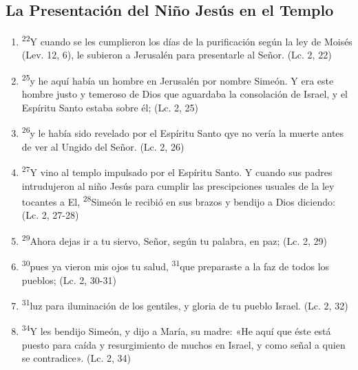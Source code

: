 \documentclass[a4paper,11pt]{article}
\begin{document}
    \subsection*{\hfil La Presentación del Niño Jesús en el Templo \hfil}
      
      \begin{enumerate}
        
        \item \textsuperscript{22}Y cuando se les cumplieron los días de la purificación según la ley de Moisés (Lev. 12, 6), 
        le subieron a Jerusalén para presentarle al Señor. (Lc. 2, 22)
        
        \item \textsuperscript{25}y he aquí había un hombre en Jerusalén por nombre Simeón. Y era este hombre justo y temeroso de Dios que aguardaba la consolación de Israel, 
        y el Espíritu Santo estaba sobre él; (Lc. 2, 25)
        
        \item \textsuperscript{26}y le había sido revelado por el Espíritu Santo qye no vería la muerte antes de ver al Ungido del Señor. (Lc. 2, 26)
        
        \item \textsuperscript{27}Y vino al templo impulsado por el Espíritu Santo. Y cuando sus padres intrudujeron al niño Jesús para cumplir las prescipciones usuales
        de la ley tocantes a El, \textsuperscript{28}Simeón le recibió en sus brazos y bendijo a Dios diciendo: (Lc. 2, 27-28)
        
        \item \textsuperscript{29}Ahora dejas ir a tu siervo, Señor, según tu palabra, en paz; (Lc. 2, 29)

        \item \textsuperscript{30}pues ya vieron mis ojos tu salud, \textsuperscript{31}que preparaste a la faz de todos los pueblos; (Lc. 2, 30-31)
        
        \item \textsuperscript{31}luz para iluminación de los gentiles, y gloria de tu pueblo Israel. (Lc. 2, 32)
        
        \item \textsuperscript{34}Y les bendijo Simeón, y dijo a María, su madre: «He aquí que éste está puesto para caída y resurgimiento de muchos en Israel, y como
        señal a quien se contradice». (Lc. 2, 34)
        

\end{enumerate}
\end{document}
